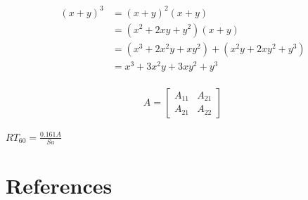 \documentclass[paper=a4, fontsize=10pt, font=arial]{scrartcl} %
\numberwithin{equation}{section} %
\numberwithin{figure}{section} %
\numberwithin{table}{section} %
\begin{document}
\begin{align} 
\begin{split}
(x+y)^3 	&= (x+y)^2(x+y)\\
&=(x^2+2xy+y^2)(x+y)\\
&=(x^3+2x^2y+xy^2) + (x^2y+2xy^2+y^3)\\
&=x^3+3x^2y+3xy^2+y^3
\end{split}					
\end{align}

\begin{align}
A = 
\begin{bmatrix}
A_{11} & A_{21} \\
A_{21} & A_{22}
\end{bmatrix}
\end{align}

\begin{center}
$RT_{60} = \frac{0.161 A}{Sa}$\\
\end{center}


\newpage
\section{References}

{}

\end{document}

